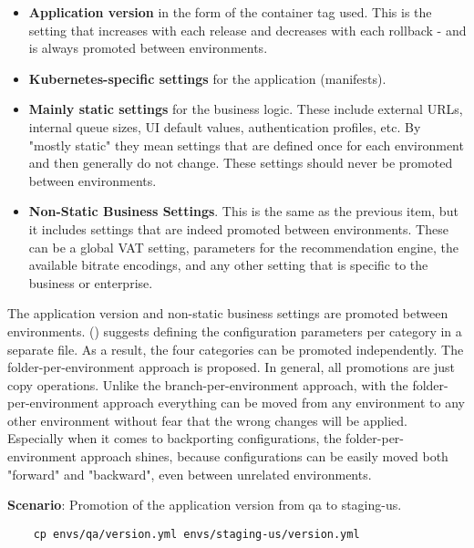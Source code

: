 \begin{itemize}
    \item \textbf{Application version} in the form of the container tag used. This is the setting that increases with each release and decreases with each rollback - and is always promoted between environments.
	\item \textbf{Kubernetes-specific settings} for the application (manifests).
	\item \textbf{Mainly static settings} for the business logic. These include external URLs, internal queue sizes, UI default values, authentication profiles, etc. By "mostly static" they mean settings that are defined once for each environment and then generally do not change. These settings should never be promoted between environments.
	\item \textbf{Non-Static Business Settings}. This is the same as the previous item, but it includes settings that are indeed promoted between environments. These can be a global VAT setting, parameters for the recommendation engine, the available bitrate encodings, and any other setting that is specific to the business or enterprise.
\end{itemize}

\noindent
\autocite{codefreshHowToModelGitOpsEnvironmentsAndPromote}
\bigskip

\noindent
The application version and non-static business settings are promoted between environments.
\citeauthor{codefreshHowToModelGitOpsEnvironmentsAndPromote} (\citeyear{codefreshHowToModelGitOpsEnvironmentsAndPromote})
suggests defining the configuration parameters per category in a separate file.
As a result, the four categories can be promoted independently.
The folder-per-environment approach is proposed.
In general, all promotions are just copy operations. 
Unlike the branch-per-environment approach, with the folder-per-environment approach 
everything can be moved from any environment to any other environment
without fear that the wrong changes will be applied. 
Especially when it comes to backporting configurations, the folder-per-environment approach shines, 
because configurations can be easily moved both "forward" and "backward", 
even between unrelated environments.
\bigskip

\noindent
\textbf{Scenario}: Promotion of the application version from qa to staging-us.

\begin{verbatim}
	cp envs/qa/version.yml envs/staging-us/version.yml
\end{verbatim}

